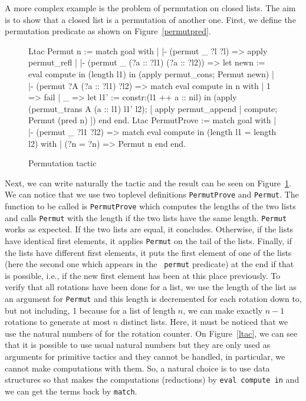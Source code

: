 \begin{coq_example}
A more complex example is the problem of permutation on closed lists.
The aim is to show that a closed list is a permutation of another one.
First, we define the permutation predicate as shown on
Figure~\ref{permutpred}.

\begin{figure}
\begin{centerframe}
\begin{coq_example}
Ltac Permut n :=
  match goal with
  | |- (permut _ ?l ?l) => apply permut_refl
  | |- (permut _ (?a :: ?l1) (?a :: ?l2)) =>
      let newn := eval compute in (length l1) in
      (apply permut_cons; Permut newn)
  | |- (permut ?A (?a :: ?l1) ?l2) =>
      match eval compute in n with
      | 1 => fail
      | _ =>
          let l1' := constr:(l1 ++ a :: nil) in
          (apply (permut_trans A (a :: l1) l1' l2);
            [ apply permut_append | compute; Permut (pred n) ])
      end
  end.
Ltac PermutProve :=
  match goal with
  | |- (permut _ ?l1 ?l2) =>
      match eval compute in (length l1 = length l2) with
      | (?n = ?n) => Permut n
      end
  end.
\end{coq_example}
\end{centerframe}
\caption{Permutation tactic}
\label{permutltac}
\end{figure}

Next, we can write naturally the tactic and the result can be seen on
Figure~\ref{permutltac}. We can notice that we use two toplevel
definitions {\tt PermutProve} and {\tt Permut}. The function to be
called is {\tt PermutProve} which computes the lengths of the two
lists and calls {\tt Permut} with the length if the two lists have the
same length. {\tt Permut} works as expected.  If the two lists are
equal, it concludes. Otherwise, if the lists have identical first
elements, it applies {\tt Permut} on the tail of the lists.  Finally,
if the lists have different first elements, it puts the first element
of one of the lists (here the second one which appears in the {\tt
  permut} predicate) at the end if that is possible, i.e., if the new
first element has been at this place previously. To verify that all
rotations have been done for a list, we use the length of the list as
an argument for {\tt Permut} and this length is decremented for each
rotation down to, but not including, 1 because for a list of length
$n$, we can make exactly $n-1$ rotations to generate at most $n$
distinct lists. Here, it must be noticed that we use the natural
numbers of {\Coq} for the rotation counter. On Figure~\ref{ltac}, we
can see that it is possible to use usual natural numbers but they are
only used as arguments for primitive tactics and they cannot be
handled, in particular, we cannot make computations with them. So, a
natural choice is to use {\Coq} data structures so that {\Coq} makes
the computations (reductions) by {\tt eval compute in} and we can get
the terms back by {\tt match}.
 

\end{coq_example}
